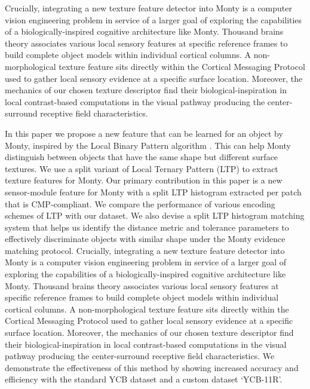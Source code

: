 \documentclass[runningheads]{llncs}
\begin{document}
Crucially, integrating a new texture feature detector into Monty is a computer vision engineering problem in service of a larger goal of exploring the capabilities of a biologically-inspired cognitive architecture like Monty. Thousand brains theory associates various local sensory features at specific reference frames to build complete object models within individual cortical columns. A non-morphological texture feature sits directly within the Cortical Messaging Protocol used to gather local sensory evidence at a specific surface location. Moreover, the mechanics of our chosen texture descriptor find their biological-inspiration in local contrast-based computations in the visual pathway producing the center-surround receptive field characteristics. 

In this paper we propose a new feature that can be learned for an object by Monty, inspired by the Local Binary Pattern algorithm \cite{ojala2000gray}. This can help Monty distinguish between objects that have the same shape but different surface textures. We use a split variant \cite{rassem2014completed} of Local Ternary Pattern (LTP) \cite{tan2007enhanced} to extract texture features for Monty. Our primary contribution in this paper is a new sensor-module feature for Monty with a split LTP histogram extracted per patch that is CMP-compliant. We compare the performance of various encoding schemes of LTP with our dataset. We also devise a split LTP histogram matching system that helps us identify the distance metric and tolerance parameters to effectively discriminate objects with similar shape under the Monty evidence matching protocol. 
Crucially, integrating a new texture feature detector into Monty is a computer vision engineering problem in service of a larger goal of exploring the capabilities of a biologically-inspired cognitive architecture like Monty. Thousand brains theory associates various local sensory features at specific reference frames to build complete object models within individual cortical columns. A non-morphological texture feature sits directly within the Cortical Messaging Protocol used to gather local sensory evidence at a specific surface location. Moreover, the mechanics of our chosen texture descriptor find their biological-inspiration in local contrast-based computations in the visual pathway producing the center-surround receptive field characteristics.  We demonstrate the effectiveness of this method by showing increased accuracy and efficiency with the standard YCB dataset and a custom dataset `YCB-11R'. 
\end{document}
